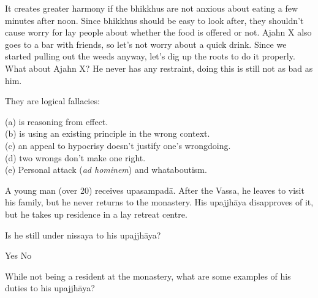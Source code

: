 \begin{exam}{\autoExamName}
\begin{problem}
  \bigskip

  \begin{answers}{1}
    \bChoices
     It creates greater harmony if the bhikkhus are not anxious about eating a few minutes after noon. \eAns
     Since bhikkhus should be easy to look after, they shouldn't cause worry for lay people about whether the food is offered or not. \eAns
     Ajahn X also goes to a bar with friends, so let's not worry about a quick drink. \eAns
     Since we started pulling out the weeds anyway, let's dig up the roots to do it properly. \eAns
     What about Ajahn X? He never has any restraint, doing this is still not as bad as him. \eAns
    \eChoices
  \end{answers}

  \begin{solution}
    They are logical fallacies:

    (a) is reasoning from effect.\\
    (b) is using an existing principle in the wrong context.\\
    (c) an appeal to hypocrisy doesn't justify one's wrongdoing.\\
    (d) two wrongs don't make one right.\\
    (e) Personal attack (\emph{ad hominem}) and whataboutism.
  \end{solution}

\end{problem}

\ifnosolutions
\problemDivide
\else
\clearpage
\fi

\begin{problem*}

  A young man (over 20) receives upasampadā. After the Vassa, he leaves to visit his family, but he never returns to the monastery. His upajjhāya disapproves of it, but he takes up residence in a lay retreat centre.

  \begin{parts}

    \item Is he still under nissaya to his upajjhāya?

    \begin{answers}{2}
      \bChoices
       Yes \eAns
       No \eAns
      \eChoices
    \end{answers}

    \item While not being a resident at the monastery, what are some examples of his duties to his upajjhāya?


\end{parts}
\end{problem*}
\end{exam}
